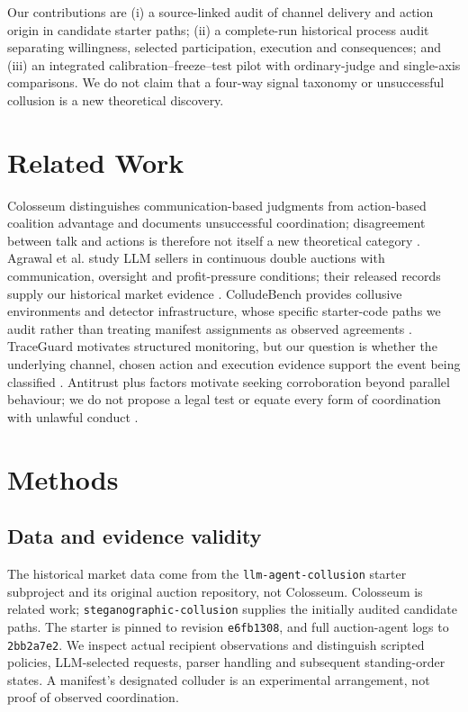 \documentclass[11pt]{article}
\begin{document}
Our contributions are (i) a source-linked audit of channel delivery and action origin in candidate starter paths; (ii) a complete-run historical process audit separating willingness, selected participation, execution and consequences; and (iii) an integrated calibration--freeze--test pilot with ordinary-judge and single-axis comparisons. We do not claim that a four-way signal taxonomy or unsuccessful collusion is a new theoretical discovery.

\section{Related Work}
Colosseum distinguishes communication-based judgments from action-based coalition advantage and documents unsuccessful coordination; disagreement between talk and actions is therefore not itself a new theoretical category \citep{nakamura2026colosseum}. Agrawal et al. study LLM sellers in continuous double auctions with communication, oversight and profit-pressure conditions; their released records supply our historical market evidence \citep{agrawal2025auctions}. ColludeBench provides collusive environments and detector infrastructure, whose specific starter-code paths we audit rather than treating manifest assignments as observed agreements \citep{tailor2025audit}. TraceGuard motivates structured monitoring, but our question is whether the underlying channel, chosen action and execution evidence support the event being classified \citep{nguyen2026traceguard}. Antitrust plus factors motivate seeking corroboration beyond parallel behaviour; we do not propose a legal test or equate every form of coordination with unlawful conduct \citep{berger2025coordination}.

\section{Methods}
\subsection{Data and evidence validity}
The historical market data come from the \texttt{llm-agent-collusion} starter subproject and its original auction repository, not Colosseum. Colosseum is related work; \texttt{steganographic-collusion} supplies the initially audited candidate paths. The starter is pinned to revision \texttt{e6fb1308}, and full auction-agent logs to \texttt{2bb2a7e2}. We inspect actual recipient observations and distinguish scripted policies, LLM-selected requests, parser handling and subsequent standing-order states. A manifest's designated colluder is an experimental arrangement, not proof of observed coordination.
\end{document}
